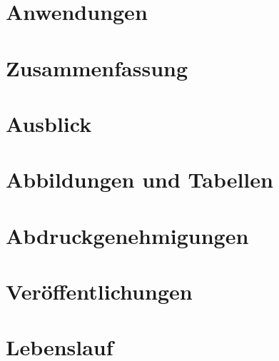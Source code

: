 \documentclass[
  paper=A4, 		%
  pagesize, 		%
  DIV=12, 		%
  ngerman,  		%
  12pt, 			%
  listof=totocnumbered, 
  bibliography=totoc, 
  index=totoc, 
  openany, 
]{scrbook}
\begin{document}
\chapter{Anwendungen}\label{anwendungen}


\chapter{Zusammenfassung}\label{zusammenfassung}


\chapter{Ausblick}\label{ausblick}


\appendix
\setcounter{figure}{0}
\renewcommand{\thefigure}{A\arabic{figure}}
\chapter{Abbildungen und Tabellen}\label{anhang}

\chapter{Abdruckgenehmigungen}

\begingroup
	\renewcommand{\addvspace}[1]{}
	\listoffigures
\endgroup

\begingroup
	\renewcommand{\addvspace}[1]{}
{
\makeatletter
\renewcommand*\l@table{\@dottedtocline{1}{1.5em}{2.7em}}
\makeatother
\listoftables
}
\endgroup
\newpage

\printglossary[type=\acronymtype,style=long]
%
\backmatter
\printbibliography[title=Literaturverzeichnis]
\chapter*{Veröffentlichungen}


\chapter*{Lebenslauf}

\newpage
\thispagestyle{empty}
\quad

\newpage
\thispagestyle{empty}
\quad
\end{document}

